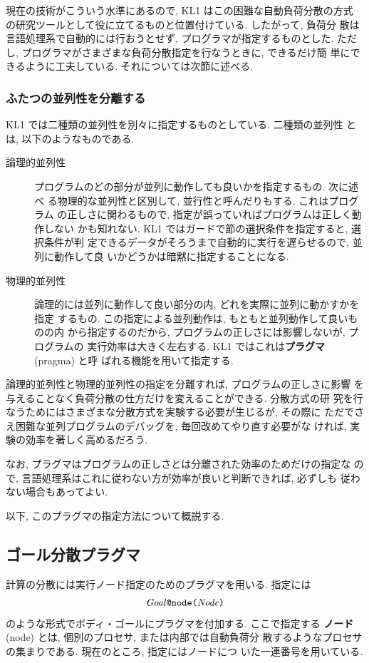 \documentclass[a4,titlepage]{jsreport}
\def\em{\bf\dg}
\let\dg\bf
\begin{document}
現在の技術がこういう水準にあるので, KL1 はこの困難な自動負荷分散の方式
の研究ツールとして役に立てるものと位置付けている.  したがって, 負荷分
散は言語処理系で自動的には行おうとせず, プログラマが指定するものとした.
ただし, プログラマがさまざまな負荷分散指定を行なうときに, できるだけ簡
単にできるように工夫している.  それについては次節に述べる.

\subsubsection{ふたつの並列性を分離する}
KL1 では二種類の並列性を別々に指定するものとしている.  二種類の並列性
とは, 以下のようなものである.
\begin{description}
\item[論理的並列性]
プログラムのどの部分が並列に動作しても良いかを指定するもの.  次に述べ
る物理的な並列性と区別して, 並行性と呼んだりもする.  これはプログラム
の正しさに関わるもので, 指定が誤っていればプログラムは正しく動作しない
かも知れない.  KL1 ではガードで節の選択条件を指定すると, 選択条件が判
定できるデータがそろうまで自動的に実行を遅らせるので, 並列に動作して良
いかどうかは暗黙に指定することになる.
\item[物理的並列性]
論理的には並列に動作して良い部分の内, どれを実際に並列に動かすかを指定
するもの.  この指定による並列動作は, もともと並列動作して良いものの内
から指定するのだから, プログラムの正しさには影響しないが, プログラムの
実行効率は大きく左右する.  KL1 ではこれは{\em プラグマ} (pragma) と呼
ばれる機能を用いて指定する.
\end{description}
論理的並列性と物理的並列性の指定を分離すれば, プログラムの正しさに影響
を与えることなく負荷分散の仕方だけを変えることができる.  分散方式の研
究を行なうためにはさまざまな分散方式を実験する必要が生じるが, その際に
ただでさえ困難な並列プログラムのデバッグを, 毎回改めてやり直す必要がな
ければ, 実験の効率を著しく高めるだろう.

なお, プラグマはプログラムの正しさとは分離された効率のためだけの指定な
ので, 言語処理系はこれに従わない方が効率が良いと判断できれば, 必ずしも
従わない場合もあってよい.

以下, このプラグマの指定方法について概説する.

\subsection{ゴール分散プラグマ}
計算の分散には実行ノード指定のためのプラグマを用いる.  指定には
\[\hbox{{\it Goal\/}{\tt @node(}{\it Node\/}{\tt )}}\]
のような形式でボディ・ゴールにプラグマを付加する.  ここで指定する
{\em ノード} (node) とは, 個別のプロセサ, または内部では自動負荷分
散するようなプロセサの集まりである.  現在のところ, 指定にはノードにつ
いた一連番号を用いている.
\end{document}
